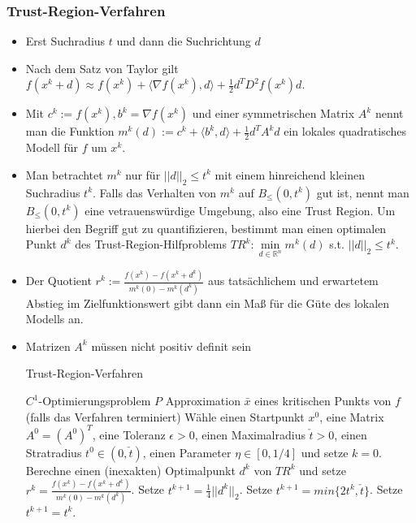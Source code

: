 \documentclass[paper=a4, fontsize=11pt]{scrartcl} %
\numberwithin{equation}{section} %
\numberwithin{figure}{section} %
\numberwithin{table}{section} %
\begin{document}
\subsubsection{Trust-Region-Verfahren}

\begin{itemize}
  \item Erst Suchradius $t$ und dann die Suchrichtung $d$
  \item Nach dem Satz von Taylor gilt $f(x^k + d) \approx f(x^k) + \langle \nabla f(x^k),d\rangle + \frac{1}{2} d^T D^2f(x^k)d$.
  \item Mit $c^k := f(x^k),b^k = \nabla f(x^k)$ und einer symmetrischen Matrix $A^k$ nennt man die Funktion $m^k(d) := c^k + \langle b^k,d\rangle + \frac{1}{2} d^T A^k d$ ein lokales quadratisches Modell für $f$ um $x^k$.
  \item Man betrachtet $m^k$ nur für $||d||_2 \le t^k$ mit einem hinreichend kleinen Suchradius $t^k$. Falls das Verhalten von $m^k$ auf $B_\le(0,t^k)$ gut ist, nennt man $B_\le(0,t^k)$ eine vetrauenswürdige Umgebung, also eine Trust Region. Um hierbei den Begriff gut zu quantifizieren, bestimmt man einen optimalen Punkt $d^k$ des Trust-Region-Hilfproblems $TR^k: \min\limits_{d \in \mathbb{R}^n} m^k(d)$ s.t. $||d||_2 \le t^k$.
  \item Der Quotient $r^k := \frac{f(x^k)-f(x^k+d^k)}{m^k(0)-m^k(d^k)}$ aus tatsächlichem und erwartetem Abstieg im Zielfunktionswert gibt dann ein Maß für die Güte des lokalen Modells an.
  \item Matrizen $A^k$ müssen nicht positiv definit sein
  \begin{algorithm}
  \caption{Trust-Region-Verfahren}
  \begin{algorithmic}[1]
    \Require $C^1$-Optimierungsproblem $P$
    \Ensure Approximation $\bar{x}$ eines kritischen Punkts von $f$ (falls das Verfahren terminiert)
    \State Wähle einen Startpunkt $x^0$, eine Matrix $A^0 = (A^0)^T$, eine Toleranz $\epsilon > 0$, einen Maximalradius $\check{t} > 0$, einen Stratradius $t^0 \in (0, \check{t})$, einen Parameter $\eta \in [0,1/4]$ und setze $k = 0$.
    \State Berechne einen (inexakten) Optimalpunkt $d^k$ von $TR^k$ und setze $r^k = \frac{f(x^k)-f(x^k+d^k)}{m^k(0)-m^k(d^k)}$.
    \State Setze $t^{k+1} = \frac{1}{4}||d^k||_2$.
    \Else
    \State Setze $t^{k+1} = min\{2t^k,\check{t}\}$.
    \Else
    \State Setze$t^{k+1} = t^k$.
    \EndIf
    \EndIf

\end{algorithmic}
\end{algorithm}
\end{itemize}
\end{document}
